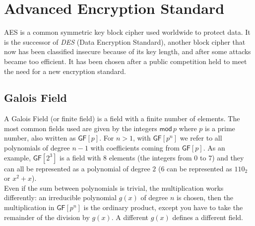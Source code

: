 \section{Advanced Encryption Standard}
AES is a common symmetric key block cipher used worldwide to protect data. It is the successor of \emph{DES} (Data Encryption Standard), another block cipher that now has been classified insecure because of its key length, and after some attacks became too efficient. It has been chosen after a public competition held to meet the need for a new encryption standard.\\

\subsection{Galois Field}
A Galois Field (or finite field) is a field with a finite number of elements. The most common fields used are given by the integers $\mathsf{mod}\,p$ where $p$ is a prime number, also written as $\mathsf{GF}[p]$. For $n > 1$, with $\mathsf{GF}[p^n]$ we refer to all polynomials of degree $n-1$ with coefficients coming from $\mathsf{GF}[p]$. As an example, $\mathsf{GF}[2^3]$ is a field with $8$ elements (the integers from 0 to 7) and they can all be represented as a polynomial of degree $2$ (6 can be represented as $110_2$ or $x^2+x$).\\
Even if the sum between polynomials is trivial, the multiplication works differently: an irreducible polynomial $g(x)$ of degree $n$ is chosen, then the multiplication in $\mathsf{GF}[p^n]$ is the ordinary product, except you have to take the remainder of the division by $g(x)$. A different $g(x)$ defines a different field.

